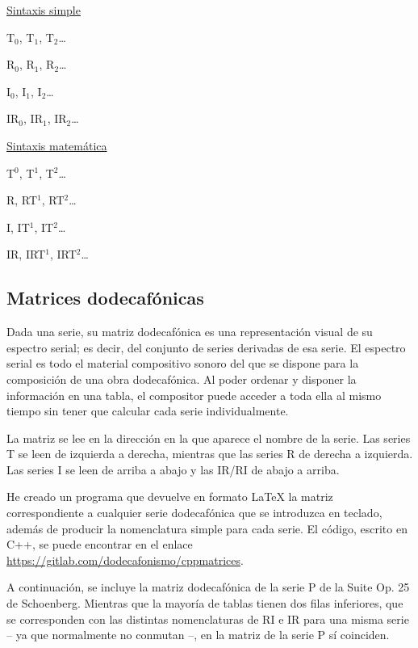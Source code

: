 		\begin{multicols}{2}
			\underline{Sintaxis simple}
			
			T$_0$, T$_1$, T$_2$\ldots
			
			R$_0$, R$_1$, R$_2$\ldots
			
			I$_0$, I$_1$, I$_2$\ldots
			
			IR$_0$, IR$_1$, IR$_2$\ldots
			
			\underline{Sintaxis matemática}
			
			T$^0$, T$^1$, T$^2$\ldots
			
			R, RT$^1$, RT$^2$\ldots
			
			I, IT$^1$, IT$^2$\ldots
			
			IR, IRT$^1$, IRT$^2$\ldots
		\end{multicols}
	
	\subsection{Matrices dodecafónicas}
		
		Dada una serie, su matriz dodecafónica es una representación visual de su espectro serial; es decir, del conjunto de series derivadas de esa serie. El espectro serial es todo el material compositivo sonoro del que se dispone para la composición de una obra dodecafónica. Al poder ordenar y disponer la información en una tabla, el compositor puede acceder a toda ella al mismo tiempo sin tener que calcular cada serie individualmente.		
		
		La matriz se lee en la dirección en la que aparece el nombre de la serie. Las series T se leen de izquierda a derecha, mientras que las series R de derecha a izquierda. Las series I se leen de arriba a abajo y las IR/RI de abajo a arriba.
		
		He creado un programa que devuelve en formato \LaTeX{} la matriz correspondiente a cualquier serie dodecafónica que se introduzca en teclado, además de producir la nomenclatura simple para cada serie. El código, escrito en C++, se puede encontrar en el enlace \url{https://gitlab.com/dodecafonismo/cppmatrices}.
		
		A continuación, se incluye la matriz dodecafónica de la serie P de la Suite Op. 25 de Schoenberg. Mientras que la mayoría de tablas tienen dos filas inferiores, que se corresponden con las distintas nomenclaturas de RI e IR para una misma serie -- ya que normalmente no conmutan --, en la matriz de la serie P sí coinciden.
		
